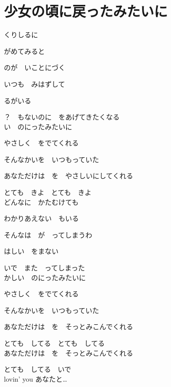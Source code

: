 \section{ 少女の頃に戻ったみたいに}
\large{

くりしるに

がめてみると

のが　いことにづく

いつも　みはずして

るがいる

？　もないのに　をあげてきたくなる
\\

い　のにったみたいに

やさしく　をでてくれる

そんなかいを　いつもっていた

あなただけは　を　やさしいにしてくれる

とても　きよ　とても　きよ
\\

どんなに　かたむけても

わかりあえない　もいる

そんなは　が　ってしまうわ

はしい　をまない

いで　また　ってしまった
\\

かしい　のにったみたいに

やさしく　をでてくれる

そんなかいを　いつもっていた

あなただけは　を　そっとみこんでくれる

とても　してる　とても　してる
\\

あなただけは　を　そっとみこんでくれる

とても　してる　いで
\\

lovin' you あなたと…

}